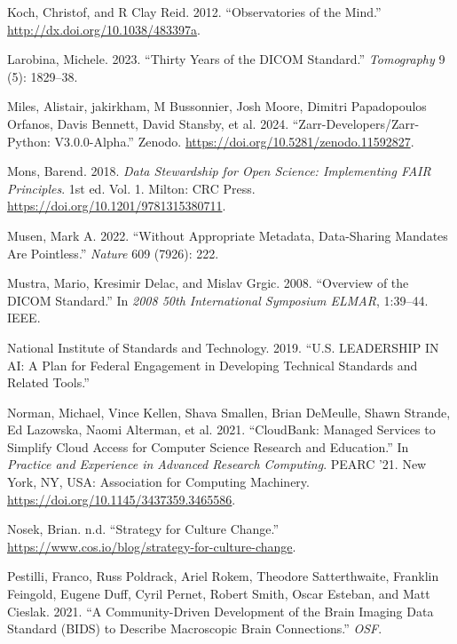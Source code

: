 \documentclass[
  letterpaper,
  DIV=11,
  numbers=noendperiod]{scrartcl}
\newlength{\cslhangindent}
\newenvironment{CSLReferences}[2] %
 {\begin{list}{}{%
  \setlength{\itemindent}{0pt}
  \setlength{\leftmargin}{0pt}
  \setlength{\parsep}{0pt}
  \ifodd #1
   \setlength{\leftmargin}{\cslhangindent}
   \setlength{\itemindent}{-1\cslhangindent}
  \fi
  \setlength{\itemsep}{#2\baselineskip}}}
 {\end{list}}
\begin{document}
\begin{CSLReferences}{1}{0}
Koch, Christof, and R Clay Reid. 2012. {``Observatories of the Mind.''}
\url{http://dx.doi.org/10.1038/483397a}.

Larobina, Michele. 2023. {``Thirty Years of the {DICOM} Standard.''}
\emph{Tomography} 9 (5): 1829--38.

Miles, Alistair, jakirkham, M Bussonnier, Josh Moore, Dimitri
Papadopoulos Orfanos, Davis Bennett, David Stansby, et al. 2024.
{``Zarr-Developers/Zarr-Python: V3.0.0-Alpha.''} Zenodo.
\url{https://doi.org/10.5281/zenodo.11592827}.

Mons, Barend. 2018. \emph{Data Stewardship for Open Science:
Implementing FAIR Principles}. 1st ed. Vol. 1. Milton: CRC Press.
\url{https://doi.org/10.1201/9781315380711}.

Musen, Mark A. 2022. {``Without Appropriate Metadata, Data-Sharing
Mandates Are Pointless.''} \emph{Nature} 609 (7926): 222.

Mustra, Mario, Kresimir Delac, and Mislav Grgic. 2008. {``Overview of
the {DICOM} Standard.''} In \emph{2008 50th International Symposium
ELMAR}, 1:39--44. IEEE.

National Institute of Standards and Technology. 2019. {``{U.S}.
{LEADERSHIP} {IN} {AI}: A Plan for Federal Engagement in Developing
Technical Standards and Related Tools.''}

Norman, Michael, Vince Kellen, Shava Smallen, Brian DeMeulle, Shawn
Strande, Ed Lazowska, Naomi Alterman, et al. 2021. {``{CloudBank:
Managed Services to Simplify Cloud Access for Computer Science Research
and Education}.''} In \emph{Practice and Experience in Advanced Research
Computing}. PEARC '21. New York, NY, USA: Association for Computing
Machinery. \url{https://doi.org/10.1145/3437359.3465586}.

Nosek, Brian. n.d. {``Strategy for Culture Change.''}
\url{https://www.cos.io/blog/strategy-for-culture-change}.

Pestilli, Franco, Russ Poldrack, Ariel Rokem, Theodore Satterthwaite,
Franklin Feingold, Eugene Duff, Cyril Pernet, Robert Smith, Oscar
Esteban, and Matt Cieslak. 2021. {``A Community-Driven Development of
the Brain Imaging Data Standard (BIDS) to Describe Macroscopic Brain
Connections.''} \emph{OSF}.


\end{CSLReferences}
\end{document}
